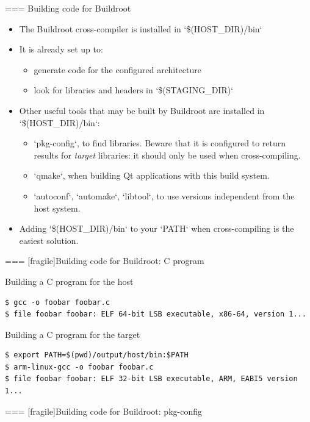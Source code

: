 === {Building code for Buildroot}
  \begin{itemize}
  \item The Buildroot cross-compiler is installed in
    `\$(HOST_DIR)/bin`
  \item It is already set up to:
    \begin{itemize}
    \item generate code for the configured architecture
    \item look for libraries and headers in `\$(STAGING_DIR)`
    \end{itemize}
  \item Other useful tools that may be built by Buildroot are
    installed in `\$(HOST_DIR)/bin`:
    \begin{itemize}
    \item `pkg-config`, to find libraries. Beware that it is
      configured to return results for {\em target} libraries: it
      should only be used when cross-compiling.
    \item `qmake`, when building Qt applications with this build
      system.
    \item `autoconf`, `automake`, `libtool`, to use
      versions independent from the host system.
    \end{itemize}
  \item Adding `\$(HOST_DIR)/bin` to your `PATH` when
    cross-compiling is the easiest solution.
  \end{itemize}


=== [fragile]{Building code for Buildroot: C program}

\begin{block}{Building a C program for the host}
{\small
  \begin{verbatim}
$ gcc -o foobar foobar.c
$ file foobar foobar: ELF 64-bit LSB executable, x86-64, version 1...
\end{verbatim}}
\end{block}

\begin{block}{Building a C program for the target}
{\small
  \begin{verbatim}
$ export PATH=$(pwd)/output/host/bin:$PATH
$ arm-linux-gcc -o foobar foobar.c
$ file foobar foobar: ELF 32-bit LSB executable, ARM, EABI5 version 1...
\end{verbatim}}
\end{block}



=== [fragile]{Building code for Buildroot: pkg-config}

